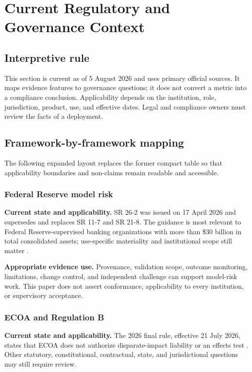 \section{Current Regulatory and Governance Context}

\subsection{Interpretive rule}

This section is current as of 5 August 2026 and uses primary official sources. It maps evidence
features to governance questions; it does not convert a metric into a compliance conclusion.
Applicability depends on the institution, role, jurisdiction, product, use, and effective dates.
Legal and compliance owners must review the facts of a deployment.

\subsection{Framework-by-framework mapping}

The following expanded layout replaces the former compact table so that applicability boundaries
and non-claims remain readable and accessible.

\subsubsection{Federal Reserve model risk}

\textbf{Current state and applicability.} SR 26-2 was issued on 17 April 2026 and supersedes and replaces
SR 11-7 and SR 21-8. The guidance is most relevant to Federal Reserve-supervised banking
organizations with more than \$30 billion in total consolidated assets; use-specific materiality
and institutional scope still matter \citep{sr26_2}.

\textbf{Appropriate evidence use.} Provenance, validation scope, outcome
monitoring, limitations, change control, and independent challenge can support model-risk work.
This paper does not assert conformance, applicability to every institution, or supervisory
acceptance.

\subsubsection{ECOA and Regulation B}

\textbf{Current state and applicability.} The 2026 final rule, effective 21 July 2026, states that ECOA does not
authorize disparate-impact liability or an effects test \citep{cfpb_regb_2026}. Other statutory,
constitutional, contractual, state, and jurisdictional questions may still require review.

